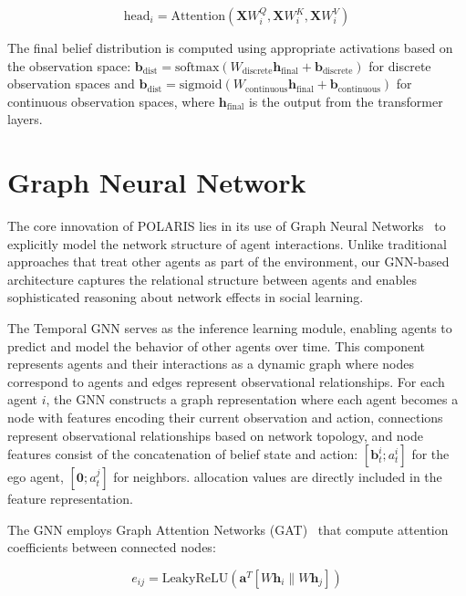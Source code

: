 \begin{equation}
    \text{head}_i = \text{Attention}(\mathbf{X}W^Q_i, \mathbf{X}W^K_i, \mathbf{X}W^V_i)
\end{equation}

The final belief distribution is computed using appropriate activations based on the observation space: $\mathbf{b}_{\text{dist}} = \text{softmax}(W_{\text{discrete}}\mathbf{h}_{\text{final}} + \mathbf{b}_{\text{discrete}})$ for discrete observation spaces and $\mathbf{b}_{\text{dist}} = \text{sigmoid}(W_{\text{continuous}}\mathbf{h}_{\text{final}} + \mathbf{b}_{\text{continuous}})$ for continuous observation spaces, where $\mathbf{h}_{\text{final}}$ is the output from the transformer layers.

\section{Graph Neural Network}

The core innovation of POLARIS lies in its use of Graph Neural Networks~\citep{hamilton2020graph} to explicitly model the network structure of agent interactions. Unlike traditional approaches that treat other agents as part of the environment, our GNN-based architecture captures the relational structure between agents and enables sophisticated reasoning about network effects in social learning.

The Temporal GNN serves as the inference learning module, enabling agents to predict and model the behavior of other agents over time. This component represents agents and their interactions as a dynamic graph where nodes correspond to agents and edges represent observational relationships. For each agent $i$, the GNN constructs a graph representation where each agent becomes a node with features encoding their current observation and action, connections represent observational relationships based on network topology, and node features consist of the concatenation of belief state and action: $[\mathbf{b}^i_t; a^i_t]$ for the ego agent, $[\mathbf{0}; a^j_t]$ for neighbors. allocation values are directly included in the feature representation.

The GNN employs Graph Attention Networks (GAT)~\citep{veličković2018graph} that compute attention coefficients between connected nodes:

\begin{equation}
    e_{ij} = \text{LeakyReLU}\left(\mathbf{a}^T\left[W\mathbf{h}_i \| W\mathbf{h}_j\right]\right)
\end{equation}


